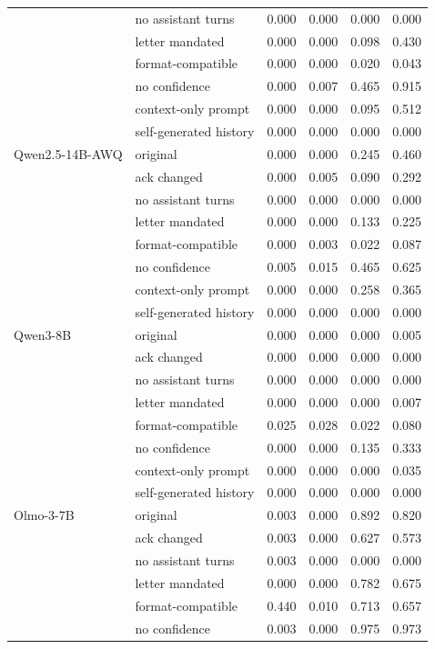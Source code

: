 \begin{tabular}{llrrrr}
 & no assistant turns & 0.000 & 0.000 & 0.000 & 0.000 \\
 & letter mandated & 0.000 & 0.000 & 0.098 & 0.430 \\
 & format-compatible & 0.000 & 0.000 & 0.020 & 0.043 \\
 & no confidence & 0.000 & 0.007 & 0.465 & 0.915 \\
 & context-only prompt & 0.000 & 0.000 & 0.095 & 0.512 \\
 & self-generated history & 0.000 & 0.000 & 0.000 & 0.000 \\
Qwen2.5-14B-AWQ & original & 0.000 & 0.000 & 0.245 & 0.460 \\
 & ack changed & 0.000 & 0.005 & 0.090 & 0.292 \\
 & no assistant turns & 0.000 & 0.000 & 0.000 & 0.000 \\
 & letter mandated & 0.000 & 0.000 & 0.133 & 0.225 \\
 & format-compatible & 0.000 & 0.003 & 0.022 & 0.087 \\
 & no confidence & 0.005 & 0.015 & 0.465 & 0.625 \\
 & context-only prompt & 0.000 & 0.000 & 0.258 & 0.365 \\
 & self-generated history & 0.000 & 0.000 & 0.000 & 0.000 \\
Qwen3-8B & original & 0.000 & 0.000 & 0.000 & 0.005 \\
 & ack changed & 0.000 & 0.000 & 0.000 & 0.000 \\
 & no assistant turns & 0.000 & 0.000 & 0.000 & 0.000 \\
 & letter mandated & 0.000 & 0.000 & 0.000 & 0.007 \\
 & format-compatible & 0.025 & 0.028 & 0.022 & 0.080 \\
 & no confidence & 0.000 & 0.000 & 0.135 & 0.333 \\
 & context-only prompt & 0.000 & 0.000 & 0.000 & 0.035 \\
 & self-generated history & 0.000 & 0.000 & 0.000 & 0.000 \\
Olmo-3-7B & original & 0.003 & 0.000 & 0.892 & 0.820 \\
 & ack changed & 0.003 & 0.000 & 0.627 & 0.573 \\
 & no assistant turns & 0.003 & 0.000 & 0.000 & 0.000 \\
 & letter mandated & 0.000 & 0.000 & 0.782 & 0.675 \\
 & format-compatible & 0.440 & 0.010 & 0.713 & 0.657 \\
 & no confidence & 0.003 & 0.000 & 0.975 & 0.973 \\

\end{tabular}
